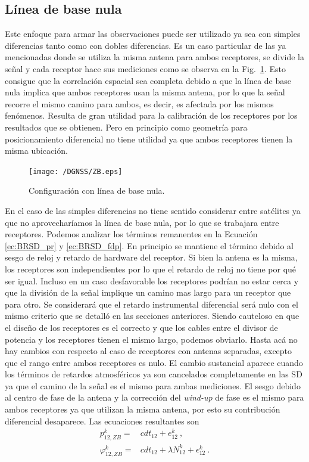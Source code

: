 \documentclass[a4paper,12pt,oneside,onecolumn,final,openright]{book}%
\begin{document}
\subsection{Línea de base nula}
	Este enfoque para armar las observaciones puede ser utilizado ya sea con simples diferencias tanto como con dobles diferencias. Es un caso particular de las ya mencionadas donde se utiliza la misma antena para ambos receptores, se divide la señal y cada receptor hace sus mediciones como se observa en la Fig.~\ref{fig:ZB}. Esto consigue que la correlación espacial sea completa debido a que la línea de base nula implica que ambos receptores usan la misma antena, por lo que la señal recorre el mismo camino para ambos, es decir, es afectada por los mismos fenómenos. Resulta de gran utilidad para la calibración de los receptores por los resultados que se obtienen. Pero en principio como geometría para posicionamiento diferencial no tiene utilidad ya que ambos receptores tienen la misma ubicación.
	
\begin{figure}
    \centering
    \texttt{[image: /DGNSS/ZB.eps]}
    \caption{Configuración con línea de base nula.}
    \label{fig:ZB}
\end{figure}

	En el caso de las simples diferencias no tiene sentido considerar entre satélites ya que no aprovecharíamos la línea de base nula, por lo que se trabajara entre receptores. Podemos analizar los términos remanentes en la Ecuación \eqref{ec:BRSD_pr} y \eqref{ec:BRSD_fdp}. En principio se mantiene el término debido al sesgo de reloj y retardo de hardware del receptor. Si bien la antena es la misma, los receptores son independientes por lo que el retardo de reloj no tiene por qué ser igual. Incluso en un caso desfavorable los receptores podrían no estar cerca y que la división de la señal implique un camino mas largo para un receptor que para otro. Se considerará que el retardo instrumental diferencial será nulo con el mismo criterio que se detalló en las secciones anteriores. Siendo cauteloso en que el diseño de los receptores es el correcto y que los cables entre el divisor de potencia y los receptores tienen el mismo largo, podemos obviarlo. Hasta acá no hay cambios con respecto al caso de receptores con antenas separadas, excepto que el rango entre ambos receptores es nulo. El cambio sustancial aparece cuando los términos de retardos atmosféricos ya son cancelados completamente en las SD ya que el camino de la señal es el mismo para ambas mediciones. El sesgo debido al centro de fase de la antena y la corrección del \textit{wind-up} de fase es el mismo para ambos receptores ya que utilizan la misma antena, por esto su contribución diferencial desaparece. Las ecuaciones resultantes son
\begin{align}
	p_{12,ZB}^k =& cdt_{12} + e_{12}^{k} \ , \\
	\varphi_{12,ZB}^k =& cdt_{12} + \lambda N_{12}^k + \epsilon_{12}^k \ .
\end{align}
	
\end{document}
